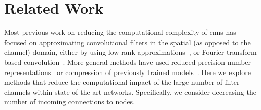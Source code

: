 \documentclass[thesis]{subfiles}
\begin{document}
	\section{Related Work}\label{previouswork}
	Most previous work on reducing the computational complexity of \glspl{cnn} has focused on approximating convolutional filters in the spatial (as opposed to the channel) domain, either by using low-rank approximations~\citep{mamalet2012simplifying,journals/corr/JaderbergVZ14, conf/cvpr/RigamontiSLF13, journals/corr/LebedevGROL14}, or Fourier transform based convolution~\citep{mathieu2013fast, rippel2015spectral}. More general methods have used reduced precision number representations~\citep{1502.02551v1} or compression of previously trained models~\citep{Chen2015,Kim2016}. Here we explore methods that reduce the computational impact of the large number of filter channels within state-of-the art networks. Specifically, we consider decreasing the number of incoming connections to nodes.
	
\end{document}
